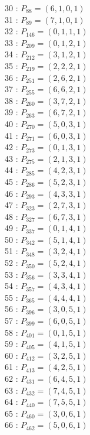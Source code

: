 \documentclass{article}
\begin{document}
{\begin{multicols}{3}
30 : $P_{88}=( 6, 1, 0, 1 )$\\
31 : $P_{89}=( 7, 1, 0, 1 )$\\
32 : $P_{146}=( 0, 1, 1, 1 )$\\
33 : $P_{209}=( 0, 1, 2, 1 )$\\
34 : $P_{212}=( 3, 1, 2, 1 )$\\
35 : $P_{219}=( 2, 2, 2, 1 )$\\
36 : $P_{251}=( 2, 6, 2, 1 )$\\
37 : $P_{255}=( 6, 6, 2, 1 )$\\
38 : $P_{260}=( 3, 7, 2, 1 )$\\
39 : $P_{263}=( 6, 7, 2, 1 )$\\
40 : $P_{270}=( 5, 0, 3, 1 )$\\
41 : $P_{271}=( 6, 0, 3, 1 )$\\
42 : $P_{273}=( 0, 1, 3, 1 )$\\
43 : $P_{275}=( 2, 1, 3, 1 )$\\
44 : $P_{285}=( 4, 2, 3, 1 )$\\
45 : $P_{286}=( 5, 2, 3, 1 )$\\
46 : $P_{293}=( 4, 3, 3, 1 )$\\
47 : $P_{323}=( 2, 7, 3, 1 )$\\
48 : $P_{327}=( 6, 7, 3, 1 )$\\
49 : $P_{337}=( 0, 1, 4, 1 )$\\
50 : $P_{342}=( 5, 1, 4, 1 )$\\
51 : $P_{348}=( 3, 2, 4, 1 )$\\
52 : $P_{350}=( 5, 2, 4, 1 )$\\
53 : $P_{356}=( 3, 3, 4, 1 )$\\
54 : $P_{357}=( 4, 3, 4, 1 )$\\
55 : $P_{365}=( 4, 4, 4, 1 )$\\
56 : $P_{396}=( 3, 0, 5, 1 )$\\
57 : $P_{399}=( 6, 0, 5, 1 )$\\
58 : $P_{401}=( 0, 1, 5, 1 )$\\
59 : $P_{405}=( 4, 1, 5, 1 )$\\
60 : $P_{412}=( 3, 2, 5, 1 )$\\
61 : $P_{413}=( 4, 2, 5, 1 )$\\
62 : $P_{431}=( 6, 4, 5, 1 )$\\
63 : $P_{432}=( 7, 4, 5, 1 )$\\
64 : $P_{440}=( 7, 5, 5, 1 )$\\
65 : $P_{460}=( 3, 0, 6, 1 )$\\
66 : $P_{462}=( 5, 0, 6, 1 )$\\

\end{multicols}}
\end{document}
